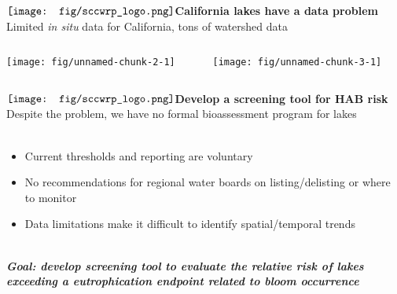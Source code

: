 \documentclass[serif]{beamer}\usepackage[]{graphicx}\usepackage[]{color}
\makeatletter
\def\maxwidth{ %
  \ifdim\Gin@nat@width>\linewidth
    \linewidth
  \else
    \Gin@nat@width
  \fi
}
\newcommand{\emtxt}[1]{\textbf{\textit{{\color{mypal4} #1}}}}
\makeatother
\begin{document}
\begin{frame}[t]{{$\vcenter{\hbox{\texttt{[image: fig/sccwrp\_logo.png]}}}$\hspace{0.07in}\textbf{California lakes have a data problem}}}
Limited \textit{in situ} data for California, tons of watershed data
\vspace{-0.15in}
\begin{columns}[t]
\begin{column}{0.5\textwidth}


{\centering \texttt{[image: fig/unnamed-chunk-2-1]} 

}



\end{column}
\begin{column}{0.5\textwidth}


{\centering \texttt{[image: fig/unnamed-chunk-3-1]} 

}



\end{column}
\end{columns}
\vspace{-0.15in}
{\tiny
\cite{USEPA09,USEPA17,Hill18}
}
\end{frame}

\begin{frame}{{$\vcenter{\hbox{\texttt{[image: fig/sccwrp\_logo.png]}}}$\hspace{0.07in}\textbf{Develop a screening tool for HAB risk}}}
Despite the problem, we have no formal bioassessment program for lakes \\~\\
\begin{itemize}
\item<+-> Current thresholds and reporting are voluntary
\item<+-> No recommendations for regional water boards on listing/delisting or where to monitor
\item<+-> Data limitations make it difficult to identify spatial/temporal trends\\~\\
\end{itemize}
\onslide<+->
\begin{center}
\emtxt{Goal: develop screening tool to evaluate the relative risk of lakes exceeding a eutrophication endpoint related to bloom occurrence}
\end{center}
\end{frame}
\end{document}
